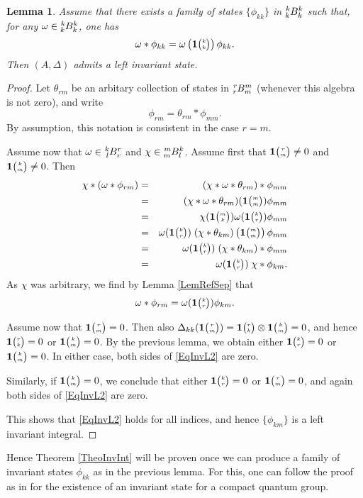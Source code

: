 \documentclass[11pt]{article}
\newcommand{\Grt}[3]{#1{\tiny {\begin{pmatrix} #2\\#3\end{pmatrix}}}}
\newcommand{\UnitC}[2]{\Grt{\mathbf{1}}{#1}{#2}}
\newcommand{\Gr}[5]{\tensor*[^{#2}_{#4}]{#1}{^{#3}_{#5}}}%
\newtheorem{Lem}[Theorem]{Lemma}
\theoremstyle{definition}
\numberwithin{equation}{section}
\begin{document}
\begin{Lem} Assume that there exists a family of states $\{\phi_{kk}\}$ in $\Gr{B}{k}{k}{k}{k}$ such that, for any $\omega \in \Gr{B}{k}{k}{k}{k}$, one has \[\omega*\phi_{kk} = \omega\left(\UnitC{k}{k}\right)\phi_{kk}.\] Then $(A,\Delta)$ admits a left invariant state.
\end{Lem}
\begin{proof} Let $\theta_{rm}$ be an arbitary collection of states in $\Gr{B}{r}{m}{r}{m}$ (whenever this algebra is not zero), and write \[\phi_{rm} = \theta_{rm}*\phi_{mm}.\] By assumption, this notation is consistent in the case $r=m$. 

Assume now that $\omega \in \Gr{B}{k}{r}{l}{r}$ and $\chi \in \Gr{B}{m}{k}{m}{l}$. Assume first that $\UnitC{r}{m}\neq 0$ and $\UnitC{k}{m}\neq 0$. Then \begin{eqnarray*} \chi*(\omega*\phi_{rm}) &=& (\chi*\omega*\theta_{rm})*\phi_{mm} \\ &=&  (\chi*\omega*\theta_{rm})(\UnitC{m}{m}) \phi_{mm} \\ &=&  \chi(\UnitC{m}{k})\omega(\UnitC{k}{r})\phi_{mm} \\ &=&  \omega(\UnitC{k}{r}) \; (\chi*\theta_{km})\left(\UnitC{m}{m}\right)\phi_{mm}
\\ &=& \omega(\UnitC{k}{r}) \; (\chi*\theta_{km})*\phi_{mm} \\ &=&  \omega(\UnitC{k}{r}) \; \chi*\phi_{km} .\end{eqnarray*} As $\chi$ was arbitrary, we find by Lemma \ref{LemRefSep} that \begin{equation}\label{EqInvL2} \omega*\phi_{rm} =  \omega(\UnitC{k}{r}) \phi_{km}.\end{equation}

Assume now that $\UnitC{r}{m}=0$. Then also $\Delta_{kk}(\UnitC{r}{m}) = \UnitC{r}{k}\otimes \UnitC{k}{m}=0$, and hence $\UnitC{r}{k}=0$ or $\UnitC{k}{m}=0$. By the previous lemma, we obtain either $\UnitC{k}{r}=0$ or $\UnitC{k}{m}=0$. In either case, both sides of \eqref{EqInvL2} are zero. 

Similarly, if $\UnitC{k}{m}=0$, we conclude that either $\UnitC{k}{r}=0$ or $\UnitC{r}{m}=0$, and again both sides of \eqref{EqInvL2} are zero.

This shows that \eqref{EqInvL2} holds for all indices, and hence $\{\phi_{km}\}$ is a left invariant integral. 
\end{proof} 

Hence Theorem \ref{TheoInvInt} will be proven once we can produce a family of invariant states $\phi_{kk}$ as in the previous lemma. For this, one can follow the proof as in \cite{MVD1} for the existence of an invariant state for a compact quantum group.
\end{document}
